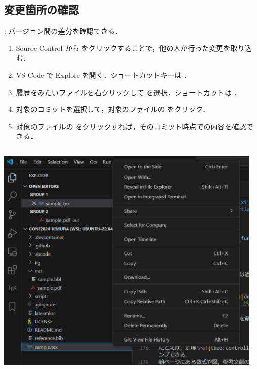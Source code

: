 \documentclass[aspectratio=169,dvipdfmx,cjk]{beamer}
\begin{document}
\subsection{変更箇所の確認}
\begin{frame}{\insertsection \thesubsection: \insertsubsection}
  バージョン間の差分を確認できる．
  \begin{enumerate}
    \item Source Control から  をクリックすることで，他の人が行った変更を取り込む．
    \item VS Code で Explore を開く．ショートカットキーは ．
    \item 履歴をみたいファイルを右クリックして を選択．ショートカットは ．
    \item 対象のコミットを選択して，対象のファイルの  をクリック．
    \item 対象のファイルの  をクリックすれば，そのコミット時点での内容を確認できる．
  \end{enumerate}
  \begin{columns}
    \begin{column}{0.3\textwidth}
        \includegraphics[width=1.0\linewidth]{fig/git-history1.png}
    \end{column}
    \begin{column}{0.3\textwidth}

\end{column}
\end{columns}
\end{frame}
\end{document}
